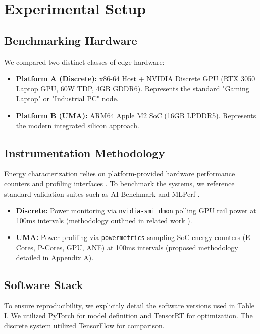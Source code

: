 \documentclass[conference]{IEEEtran}
\begin{document}
\section{Experimental Setup}

\subsection{Benchmarking Hardware}
We compared two distinct classes of edge hardware:
\begin{itemize}
    \item \textbf{Platform A (Discrete):} x86-64 Host + NVIDIA Discrete GPU (RTX 3050 Laptop GPU, 60W TDP, 4GB GDDR6). Represents the standard "Gaming Laptop" or "Industrial PC" node.
    \item \textbf{Platform B (UMA):} ARM64 Apple M2 SoC (16GB LPDDR5). Represents the modern integrated silicon approach.
\end{itemize}

\subsection{Instrumentation Methodology}
Energy characterization relies on platform-provided hardware performance counters and profiling interfaces \cite{b4}. To benchmark the systems, we reference standard validation suites such as AI Benchmark \cite{b14} and MLPerf \cite{b30}.
\begin{itemize}
    \item \textbf{Discrete:} Power monitoring via \texttt{nvidia-smi dmon} polling GPU rail power at 100ms intervals (methodology outlined in related work \cite{b21}).
    \item \textbf{UMA:} Power profiling via \texttt{powermetrics} sampling SoC energy counters (E-Cores, P-Cores, GPU, ANE) at 100ms intervals (proposed methodology detailed in Appendix A).
\end{itemize}

\subsection{Software Stack}
To ensure reproducibility, we explicitly detail the software versions used in Table I. We utilized PyTorch \cite{b13} for model definition and TensorRT \cite{b9} for optimization. The discrete system utilized TensorFlow \cite{b40} for comparison.
\end{document}
